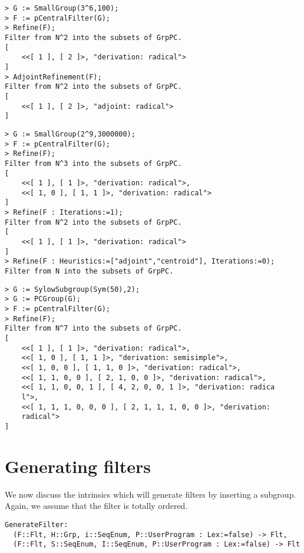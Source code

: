 \documentclass{amsart}
\begin{document}
{\small
\begin{lstlisting}[frame=single,basicstyle=\ttfamily\color{black!30!teal},backgroundcolor=\color{white!70!gray}]
> G := SmallGroup(3^6,100);
> F := pCentralFilter(G);
> Refine(F);
Filter from N^2 into the subsets of GrpPC.
[
    <<[ 1 ], [ 2 ]>, "derivation: radical">
]
> AdjointRefinement(F);
Filter from N^2 into the subsets of GrpPC.
[
    <<[ 1 ], [ 2 ]>, "adjoint: radical">
]
\end{lstlisting}
\begin{lstlisting}[frame=single,basicstyle=\ttfamily\color{black!30!teal},backgroundcolor=\color{white!70!gray}]
> G := SmallGroup(2^9,3000000);
> F := pCentralFilter(G);
> Refine(F);
Filter from N^3 into the subsets of GrpPC.
[
    <<[ 1 ], [ 1 ]>, "derivation: radical">,
    <<[ 1, 0 ], [ 1, 1 ]>, "derivation: radical">
]
> Refine(F : Iterations:=1);
Filter from N^2 into the subsets of GrpPC.
[
    <<[ 1 ], [ 1 ]>, "derivation: radical">
]
> Refine(F : Heuristics:=["adjoint","centroid"], Iterations:=0);
Filter from N into the subsets of GrpPC.
\end{lstlisting}
\begin{lstlisting}[frame=single,basicstyle=\ttfamily\color{black!30!teal},backgroundcolor=\color{white!70!gray}]
> G := SylowSubgroup(Sym(50),2);
> G := PCGroup(G);              
> F := pCentralFilter(G);
> Refine(F);
Filter from N^7 into the subsets of GrpPC.
[
    <<[ 1 ], [ 1 ]>, "derivation: radical">,
    <<[ 1, 0 ], [ 1, 1 ]>, "derivation: semisimple">,
    <<[ 1, 0, 0 ], [ 1, 1, 0 ]>, "derivation: radical">,
    <<[ 1, 1, 0, 0 ], [ 2, 1, 0, 0 ]>, "derivation: radical">,
    <<[ 1, 1, 0, 0, 1 ], [ 4, 2, 0, 0, 1 ]>, "derivation: radica
    l">,
    <<[ 1, 1, 1, 0, 0, 0 ], [ 2, 1, 1, 1, 0, 0 ]>, "derivation: 
    radical">
]

\end{lstlisting}
}

\section{Generating filters}

We now discuss the intrinsics  which will generate filters by inserting a subgroup. Again, we assume that the filter is totally ordered.

\color{blue}
\begin{verbatim}
GenerateFilter:
  (F::Flt, H::Grp, i::SeqEnum, P::UserProgram : Lex:=false) -> Flt,
  (F::Flt, S::SeqEnum, I::SeqEnum, P::UserProgram : Lex:=false) -> Flt
\end{verbatim}
\color{black}
\end{document}
